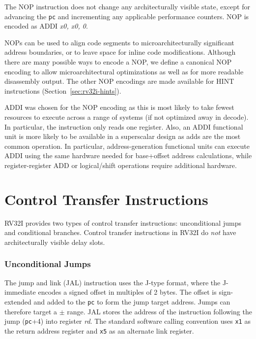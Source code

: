 The NOP instruction does not change any architecturally visible state, except for
advancing the {\tt pc} and incrementing any applicable performance
counters.  NOP is encoded as ADDI {\em x0, x0, 0}.

\begin{commentary}
NOPs can be used to align code segments to microarchitecturally
significant address boundaries, or to leave space for inline code
modifications.  Although there are many possible ways to encode a NOP,
we define a canonical NOP encoding to allow microarchitectural
optimizations as well as for more readable disassembly output.  The
other NOP encodings are made available for HINT instructions
(Section~\ref{sec:rv32i-hints}).

ADDI was chosen for the NOP encoding as this is most likely to take
fewest resources to execute across a range of systems (if not
optimized away in decode).  In particular, the instruction only reads
one register.  Also, an ADDI functional unit is more likely to be
available in a superscalar design as adds are the most common
operation.  In particular, address-generation functional units can
execute ADDI using the same hardware needed for base+offset address
calculations, while register-register ADD or logical/shift operations
require additional hardware.
\end{commentary}

\section{Control Transfer Instructions}

RV32I provides two types of control transfer instructions:
unconditional jumps and conditional branches.  Control transfer
instructions in RV32I do {\em not} have architecturally visible delay
slots.

\subsubsection*{Unconditional Jumps}

\vspace{-0.1in} The jump and link (JAL) instruction uses the J-type
format, where the J-immediate encodes a signed offset in multiples of
2 bytes.  The offset is sign-extended and added to the {\tt pc}
to form the jump target address.  Jumps can therefore target a
$\pm$ range. JAL stores the address of the instruction
following the jump ({\tt pc}+4) into register {\em rd}.  The standard
software calling convention uses {\tt x1} as the return address
register and {\tt x5} as an alternate link register.

